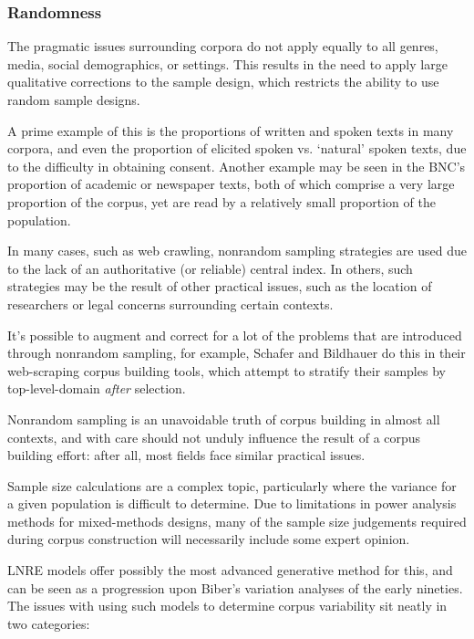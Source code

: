 \subsubsection{Randomness}
The pragmatic issues surrounding corpora do not apply equally to all genres, media, social demographics, or settings.  This results in the need to apply large qualitative corrections to the sample design, which restricts the ability to use random sample designs.

A prime example of this is the proportions of written and spoken texts in many corpora, and even the proportion of elicited spoken vs. `natural' spoken texts, due to the difficulty in obtaining consent.  Another example may be seen in the BNC's proportion of academic or newspaper texts, both of which comprise a very large proportion of the corpus, yet are read by a relatively small proportion of the population.

In many cases, such as web crawling, nonrandom sampling strategies are used due to the lack of an authoritative (or reliable) central index.  In others, such strategies may be the result of other practical issues, such as the location of researchers or legal concerns surrounding certain contexts.

It's possible to augment and correct for a lot of the problems that are introduced through nonrandom sampling, for example, Schafer and Bildhauer do this in their web-scraping corpus building tools, which attempt to stratify their samples by top-level-domain \textsl{after} selection\cite{schafer2014focused}.

Nonrandom sampling is an unavoidable truth of corpus building in almost all contexts, and with care should not unduly influence the result of a corpus building effort: after all, most fields face similar practical issues.

Sample size calculations are a complex topic, particularly where the variance for a given population is difficult to determine.  Due to limitations in power analysis methods for mixed-methods designs, many of the sample size judgements required during corpus construction will necessarily include some expert opinion.

LNRE models offer possibly the most advanced generative method for this\cite{baayen1998sample,evert2007zipfr}, and can be seen as a progression upon Biber's variation analyses of the early nineties.  The issues with using such models to determine corpus variability sit neatly in two categories:

